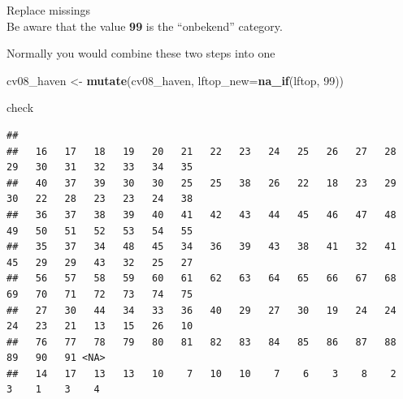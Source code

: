 \documentclass[
]{book}
\newenvironment{Shaded}{\begin{snugshade}}{\end{snugshade}}
\newcommand{\DataTypeTok}[1]{\textcolor[rgb]{0.13,0.29,0.53}{#1}}
\newcommand{\DecValTok}[1]{\textcolor[rgb]{0.00,0.00,0.81}{#1}}
\newcommand{\KeywordTok}[1]{\textcolor[rgb]{0.13,0.29,0.53}{\textbf{#1}}}
\newcommand{\NormalTok}[1]{#1}
\newcommand{\OperatorTok}[1]{\textcolor[rgb]{0.81,0.36,0.00}{\textbf{#1}}}
\newcommand{\StringTok}[1]{\textcolor[rgb]{0.31,0.60,0.02}{#1}}
\begin{document}
Replace missings\\
Be aware that the value \textbf{99} is the ``onbekend'' category.

\begin{Shaded}
\end{Shaded}

Normally you would combine these two steps into one

\begin{Shaded}
\begin{Highlighting}[numbers=left,,]
\NormalTok{cv08_haven <-}\StringTok{ }\KeywordTok{mutate}\NormalTok{(cv08_haven, }\DataTypeTok{lftop_new=}\KeywordTok{na_if}\NormalTok{(lftop, }\DecValTok{99}\NormalTok{))}
\end{Highlighting}
\end{Shaded}

check

\begin{Shaded}
\end{Shaded}

\begin{verbatim}
## 
##   16   17   18   19   20   21   22   23   24   25   26   27   28   29   30   31   32   33   34   35 
##   40   37   39   30   30   25   25   38   26   22   18   23   29   30   22   28   23   23   24   38 
##   36   37   38   39   40   41   42   43   44   45   46   47   48   49   50   51   52   53   54   55 
##   35   37   34   48   45   34   36   39   43   38   41   32   41   45   29   29   43   32   25   27 
##   56   57   58   59   60   61   62   63   64   65   66   67   68   69   70   71   72   73   74   75 
##   27   30   44   34   33   36   40   29   27   30   19   24   24   24   23   21   13   15   26   10 
##   76   77   78   79   80   81   82   83   84   85   86   87   88   89   90   91 <NA> 
##   14   17   13   13   10    7   10   10    7    6    3    8    2    3    1    3    4
\end{verbatim}
\end{document}
